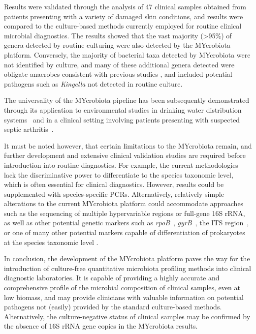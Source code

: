 Results were validated through the analysis of 47 clinical samples obtained from patients presenting with a variety of damaged skin conditions, and results were compared to the culture-based methods currently employed for routine clinical microbial diagnostics. The results showed that the vast majority (>95\%) of genera detected by routine culturing were also detected by the MYcrobiota platform. Conversely, the majority of bacterial taxa detected by MYcrobiota were not identified by culture, and many of these additional genera detected were obligate anaerobes consistent with previous studies \cite{TODO}, and included potential pathogens such as \emph{Kingella} not detected in routine culture.

The universality of the MYcrobiota pipeline has been subsequently demonstrated through its application to environmental studies in drinking water distribution systems~\cite{boers2018monitoring} and in a clinical setting involving patients presenting with suspected septic arthritis~\cite{boers2018detection}.

It must be noted however, that certain limitations to the MYcrobiota remain, and further development and extensive clinical validation studies are required before introduction into routine diagnostics. For example, the current methodologies lack the discriminative power to differentiate to the species taxonomic level, which is often essential for clinical diagnostics. However, results could be supplemented with species-specific PCRs. Alternatively, relatively simple alterations to the current MYcrobiota platform could accommodate approaches such as the sequencing of multiple hypervariable regions or full-gene 16S rRNA, as well as other potential genetic markers such as \emph{rpoB}~\cite{adekambi2009rpob}, \emph{gyrB}~\cite{yanamoto1995pcr}, the ITS region~\cite{schoch20012nuclear}, or one of many other potential markers capable of differentiation of prokaryotes at the species taxonomic level \cite{lab2016marker,sabat2017targeted}.

In conclusion, the development of the MYcrobiota platform paves the way for the introduction of culture-free quantitative microbiota profiling methods into clinical diagnostic laboratories. It is capable of providing a highly accurate and comprehensive profile of the microbial composition of clinical samples, even at low biomass, and may provide clinicians with valuable information on potential pathogens not (easily) provided by the standard culture-based methods. Alternatively, the culture-negative status of clinical samples may be confirmed by the absence of 16S rRNA gene copies in the MYcrobiota results.

